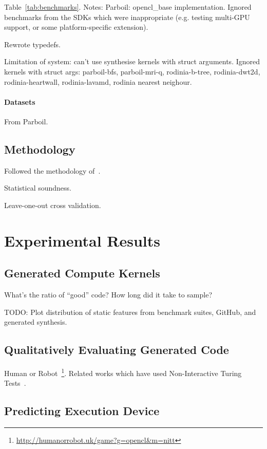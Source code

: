 \documentclass[preprint,nonatbib,10pt,nocopyrightspace]{sigplanconf}
\begin{document}
Table~\ref{tab:benchmarks}. Notes: Parboil: opencl\_base
implementation. Ignored benchmarks from the SDKs which were
inappropriate (e.g. testing multi-GPU support, or some
platform-specific extension).

Rewrote typedefs.

Limitation of system: can't use synthesise kernels with struct
arguments. Ignored kernels with struct args: %
parboil-bfs, %
parboil-mri-q, %
rodinia-b-tree, %
rodinia-dwt2d, %
rodinia-heartwall, %
rodinia-lavamd, %
rodinia nearest neighour.


\paragraph{Datasets}

From Parboil.


\subsection{Methodology}

Followed the methodology of~\cite{Grewe2013}.

Statistical soundness.

Leave-one-out cross validation.


\section{Experimental Results}\label{sec:evaluation}


\subsection{Generated Compute Kernels}\label{subsec:}

What's the ratio of ``good'' code? How long did it take to sample?

TODO: Plot distribution of static features from benchmark suites,
GitHub, and generated synthesis.


\subsection{Qualitatively Evaluating Generated Code}\label{subsec:}

Human or
Robot~\footnote{\url{http://humanorrobot.uk/game?g=opencl&m=nitt}}. Related
works which have used Non-Interactive Turing
Tests~\cite{Gao2015a,Zhang2016}.


\subsection{Predicting Execution Device}\label{subsec:}
\end{document}
